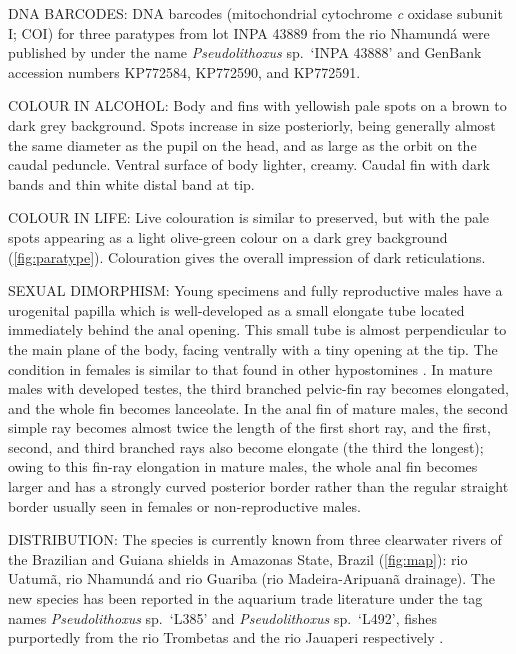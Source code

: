 \documentclass[12pt]{article}
\begin{document}
\noindent DNA BARCODES: DNA barcodes (mitochondrial cytochrome \emph{c} oxidase subunit I; COI) for three paratypes from lot INPA 43889 from the rio Nhamundá were published by \citet{Collins2015} under the name \emph{Pseudolithoxus} sp.\ `INPA 43888' and GenBank accession numbers KP772584, KP772590, and KP772591.\\%
\bigskip

\noindent COLOUR IN ALCOHOL:  Body and fins with yellowish pale spots on a brown to dark grey background. %
Spots increase in size posteriorly, being generally almost the same diameter as the pupil on the head, and as large as the orbit on the caudal peduncle. %
Ventral surface of body lighter, creamy. %
Caudal fin with dark bands and thin white distal band at tip.\\%
\bigskip

\noindent COLOUR IN LIFE: Live colouration is similar to preserved, but with the pale spots appearing as a light olive-green colour on a dark grey background (\autoref{fig:paratype}). %
Colouration gives the overall impression of dark reticulations.\\%
\bigskip

\noindent SEXUAL DIMORPHISM: Young specimens and fully reproductive males have a urogenital papilla which is well-developed as a small elongate tube located immediately behind the anal opening. %
This small tube is almost perpendicular to the main plane of the body, facing ventrally with a tiny opening at the tip. %
The condition in females is similar to that found in other hypostomines \citep{Ballen2012,Lujan2015chaeto}. %
In mature males with developed testes, the third branched pelvic-fin ray becomes elongated, and the whole fin becomes lanceolate. %
In the anal fin of mature males, the second simple ray becomes almost twice the length of the first short ray, and the first, second, and third branched rays also become elongate (the third the longest); owing to this fin-ray elongation in mature males, the whole anal fin becomes larger and has a strongly curved posterior border rather than the regular straight border usually seen in females or non-reproductive males.\\%
\bigskip

\noindent DISTRIBUTION: The species is currently known from three clearwater rivers of the Brazilian and Guiana shields in Amazonas State, Brazil (\autoref{fig:map}): rio Uatumã, rio Nhamundá and rio Guariba (rio Madeira-Aripuanã drainage). %
The new species has been reported in the aquarium trade literature under the tag names \emph{Pseudolithoxus} sp.\ `L385' and \emph{Pseudolithoxus} sp.\ `L492', fishes purportedly from the rio Trombetas and the rio Jauaperi  respectively \citep{Dignall2018,Seidel2005}.\\%
\bigskip
\end{document}

